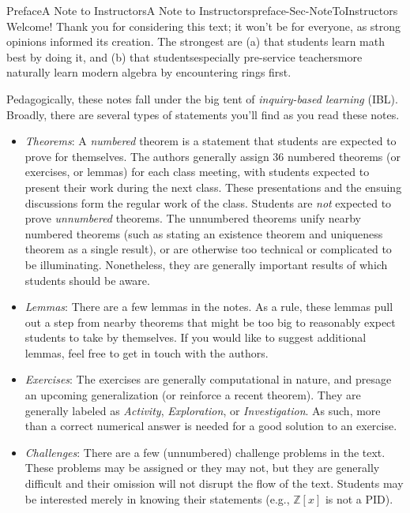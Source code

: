 \documentclass[oneside,10pt,]{book}
\numberwithin{equation}{section}
\def\Z{{\mathbb Z}}
\begin{document}
%
%
\typeout{************************************************}
\typeout{************************************************}
%
\begin{preface}{Preface}{A Note to Instructors}{}{A Note to Instructors}{}{}{preface-Sec-NoteToInstructors}
Welcome! Thank you for considering this text; it won't be for everyone, as strong opinions informed its creation. The strongest are (a) that students learn math best by doing it, and (b) that students\textendash{}especially pre-service teachers\textendash{}more naturally learn modern algebra by encountering rings first.%
\par
Pedagogically, these notes fall under the big tent of \emph{inquiry-based learning} (IBL). Broadly, there are several types of statements you'll find as you read these notes.%
\begin{itemize}[label=\textbullet]
\item{}\emph{Theorems}: A \emph{numbered} theorem is a statement that students are expected to prove for themselves. The authors generally assign 3\textendash{}6 numbered theorems (or exercises, or lemmas) for each class meeting, with students expected to present their work during the next class. These presentations and the ensuing discussions form the regular work of the class. Students are \emph{not} expected to prove \emph{unnumbered} theorems. The unnumbered theorems unify nearby numbered theorems (such as stating an existence theorem and uniqueness theorem as a single result), or are otherwise too technical or complicated to be illuminating. Nonetheless, they are generally important results of which students should be aware.%
\item{}\emph{Lemmas}: There are a few lemmas in the notes. As a rule, these lemmas pull out a step from nearby theorems that might be too big to reasonably expect students to take by themselves. If you would like to suggest additional lemmas, feel free to get in touch with the authors.%
\item{}\emph{Exercises}: The exercises are generally computational in nature, and presage an upcoming generalization (or reinforce a recent theorem). They are generally labeled as \emph{Activity}, \emph{Exploration}, or \emph{Investigation}. As such, more than a correct numerical answer is needed for a good solution to an exercise.%
\item{}\emph{Challenges}: There are a few (unnumbered) challenge problems in the text. These problems may be assigned or they may not, but they are generally difficult and their omission will not disrupt the flow of the text. Students may be interested merely in knowing their statements (e.g., \(\Z[x]\) is not a PID).%

\end{itemize}
\end{preface}
\end{document}
